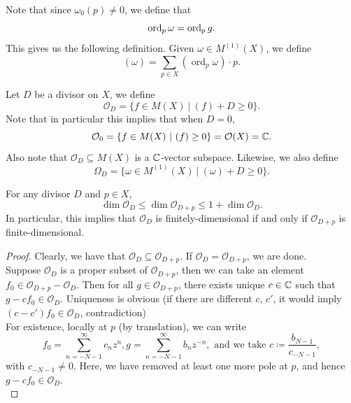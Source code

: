 \documentclass{article}
\begin{document}
{\begin{definition}
Note that since $\omega_0(p) \neq 0$, we define that
\[\operatorname{ord}_p \omega = \operatorname{ord}_p g.\]
This gives us the following definition. Given $\omega \in M^{(1)}(X)$, we define
    \[(\omega) = \sum_{p \in X} (\operatorname{ord}_p \omega)\cdot p.\]
\end{definition}

\begin{definition}
    Let $D$ be a divisor on $X$, we define
    \[\mathcal{O}_D = \{f \in M(X)\ |\ (f) + D \geq 0\}.\]
    Note that in particular this implies that when $D = 0$,
    \[\mathcal{O}_0 = \{f \in M(X)\ |\ (f) \geq 0\} = \mathcal{O}(X) = \mathbb{C}.\]
    Also note that $\mathcal{O}_D \subseteq M(X)$ is a $\mathbb{C}$-vector subspace. Likewise, we also define
    \[\Omega_D = \{\omega \in M^{(1)}(X)\ |\ (\omega) + D \geq 0\}.\]
\end{definition}

\begin{lemma}
    For any divisor $D$ and $p \in X$,
    \[\dim \mathcal{O}_D \leq \dim \mathcal{O}_{D + p} \leq 1 + \dim \mathcal{O}_D.\]
    In particular, this implies that $\mathcal{O}_D$ is finitely-dimensional if and only if $\mathcal{O}_{D+p}$ is finite-dimensional.
\end{lemma}

\begin{proof}
    Clearly, we have that $\mathcal{O}_{D} \subseteq \mathcal{O}_{D+p}$. If $\mathcal{O}_D = \mathcal{O}_{D+p}$, we are done.\\
    
    Suppose $\mathcal{O}_D$ is a proper subset of $\mathcal{O}_{D+p}$, then we can take an element $f_0 \in \mathcal{O}_{D+p} - \mathcal{O}_D$. Then for all $g \in \mathcal{O}_{D+p}$, there exists unique $c \in \mathbb{C}$ such that $g - c f_0 \in \mathcal{O}_D$. Uniqueness is obvious (if there are different $c$, $c'$, it would imply $(c - c') f_0 \in \mathcal{O}_D$, contradiction)\\

    For existence, locally at $p$ (by translation), we can write
    \[f_0 = \sum_{n=-N-1}^\infty c_n z^n, g = \sum_{n=-N-1}^\infty b_n z^{-n}, \text{ and we take } c \coloneqq \frac{b_{N-1}}{c_{-N-1}},\]
    with $c_{-N-1} \neq 0$. Here, we have removed at least one more pole at $p$, and hence $g - c f_0 \in \mathcal{O}_D$.\\


\end{proof}}
\end{document}
